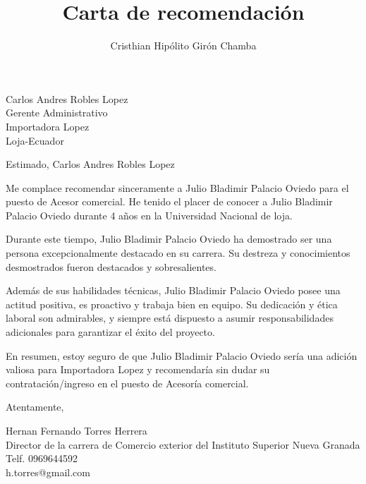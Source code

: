 \documentclass{letter}
\begin{document}
\title{Carta de recomendación}
\author{Cristhian Hipólito Girón Chamba}


\begin{letter}{Carlos Andres Robles Lopez \\ Gerente Administrativo \\ Importadora Lopez \\ Loja-Ecuador}

    \opening{Estimado, Carlos Andres Robles Lopez}

    Me complace recomendar sinceramente a Julio Bladimir Palacio Oviedo para el puesto de Acesor comercial. He tenido el placer de conocer a Julio Bladimir Palacio Oviedo durante 4 años en la Universidad Nacional de loja.

    Durante este tiempo, Julio Bladimir Palacio Oviedo ha demostrado ser una persona excepcionalmente destacado en su carrera. Su destreza y conocimientos desmostrados fueron destacados y sobresalientes.

    Además de sus habilidades técnicas, Julio Bladimir Palacio Oviedo posee una actitud positiva, es proactivo y trabaja bien en equipo. Su dedicación y ética laboral son admirables, y siempre está dispuesto a asumir responsabilidades adicionales para garantizar el éxito del proyecto.

    En resumen, estoy seguro de que Julio Bladimir Palacio Oviedo sería una adición valiosa para Importadora Lopez y recomendaría sin dudar su contratación/ingreso en el puesto de Acesoría comercial.

    \closing{Atentamente,}

    Hernan Fernando Torres Herrera \\
    Director de la carrera de Comercio exterior del Instituto Superior Nueva Granada \\
    Telf. 0969644592 \\
    h.torres@gmail.com

\end{letter}
\end{document}
